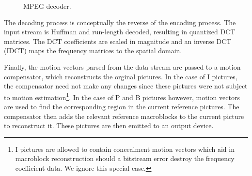 \begin{figure}[t]
\begin{center}
\vspace{-12pt}
 \caption{MPEG decoder.}
 \label{fig:mpeg-decoder}
\end{center}
\end{figure}

The decoding process is conceptually the reverse of the encoding
process. The input stream is Huffman and run-length decoded, resulting
in quantized DCT matrices. The DCT coefficients are scaled in
magnitude and an inverse DCT (IDCT) maps the frequency matrices to the
spatial domain.

Finally, the motion vectors parsed from the data stream are passed to
a motion compensator, which reconstructs the orginal pictures. In the
case of I pictures, the compensator need not make any changes since
these pictures were not subject to motion estimation\footnote{I 
pictures are allowed to contain concealment motion vectors which aid in
macroblock reconstruction should a bitstream error destroy the 
frequency coefficient data. We ignore this special case.}. In the case of P
and B pictures however, motion vectors are used to find the
corresponding region in the current reference pictures. The
compensator then adds the relevant reference macroblocks to the
current picture to reconstruct it. These pictures are then emitted to
an output device.